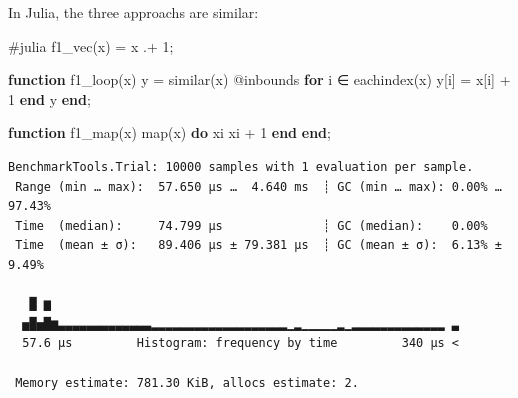 \documentclass[
  letterpaper,
  DIV=11,
  numbers=noendperiod]{scrartcl}
\newenvironment{Shaded}{\begin{snugshade}}{\end{snugshade}}
\newcommand{\BuiltInTok}[1]{\textcolor[rgb]{0.00,0.23,0.31}{#1}}
\newcommand{\CommentTok}[1]{\textcolor[rgb]{0.37,0.37,0.37}{#1}}
\newcommand{\ControlFlowTok}[1]{\textcolor[rgb]{0.00,0.23,0.31}{\textbf{#1}}}
\newcommand{\FloatTok}[1]{\textcolor[rgb]{0.68,0.00,0.00}{#1}}
\newcommand{\FunctionTok}[1]{\textcolor[rgb]{0.28,0.35,0.67}{#1}}
\newcommand{\ImportTok}[1]{\textcolor[rgb]{0.00,0.46,0.62}{#1}}
\newcommand{\KeywordTok}[1]{\textcolor[rgb]{0.00,0.23,0.31}{\textbf{#1}}}
\newcommand{\NormalTok}[1]{\textcolor[rgb]{0.00,0.23,0.31}{#1}}
\newcommand{\OperatorTok}[1]{\textcolor[rgb]{0.37,0.37,0.37}{#1}}
\newcommand{\PreprocessorTok}[1]{\textcolor[rgb]{0.68,0.00,0.00}{#1}}
\begin{document}
In Julia, the three approachs are similar:

\begin{Shaded}
\begin{Highlighting}[]
\CommentTok{\#julia}
\FunctionTok{f1\_vec}\NormalTok{(x) }\OperatorTok{=}\NormalTok{ x }\OperatorTok{.+} \FloatTok{1}\NormalTok{;}

\KeywordTok{function} \FunctionTok{f1\_loop}\NormalTok{(x)}
\NormalTok{    y }\OperatorTok{=} \FunctionTok{similar}\NormalTok{(x)}
    \PreprocessorTok{@inbounds} \ControlFlowTok{for}\NormalTok{ i }\OperatorTok{∈} \FunctionTok{eachindex}\NormalTok{(x) y[i] }\OperatorTok{=}\NormalTok{ x[i] }\OperatorTok{+} \FloatTok{1} \ControlFlowTok{end}
\NormalTok{    y}
\KeywordTok{end}\NormalTok{;}

\KeywordTok{function} \FunctionTok{f1\_map}\NormalTok{(x)}
    \FunctionTok{map}\NormalTok{(x) }\ControlFlowTok{do}\NormalTok{ xi}
\NormalTok{        xi }\OperatorTok{+} \FloatTok{1} 
    \ControlFlowTok{end}
\KeywordTok{end}\NormalTok{;}
\end{Highlighting}
\end{Shaded}

\begin{Shaded}
\end{Shaded}

\begin{verbatim}
BenchmarkTools.Trial: 10000 samples with 1 evaluation per sample.
 Range (min … max):  57.650 μs …  4.640 ms  ┊ GC (min … max): 0.00% … 97.43%
 Time  (median):     74.799 μs              ┊ GC (median):    0.00%
 Time  (mean ± σ):   89.406 μs ± 79.381 μs  ┊ GC (mean ± σ):  6.13% ±  9.49%

   █ ▆                                                         
  ▅█▅█▆▃▃▃▃▃▃▃▃▃▃▃▃▃▂▂▂▂▂▂▂▂▂▂▂▂▂▂▂▂▂▂▂▁▂▁▁▁▁▁▂▁▂▂▂▂▂▂▂▂▂▂▂▂▂ ▃
  57.6 μs         Histogram: frequency by time         340 μs <

 Memory estimate: 781.30 KiB, allocs estimate: 2.
\end{verbatim}

\begin{Shaded}
\end{Shaded}
\end{document}
